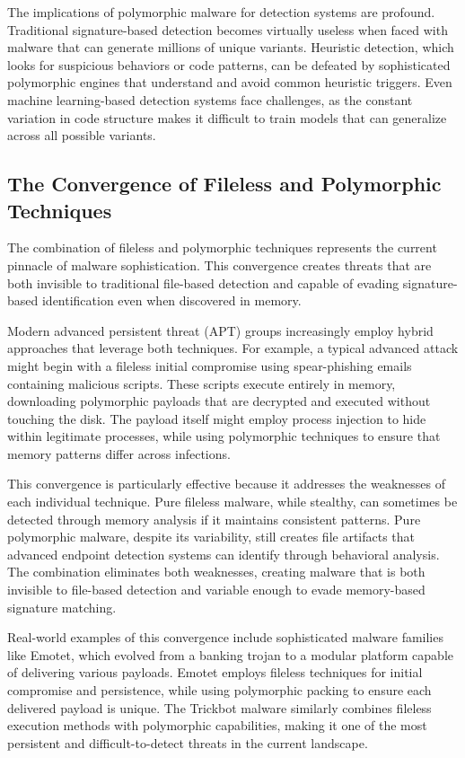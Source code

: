 The implications of polymorphic malware for detection systems are profound. Traditional signature-based detection becomes virtually useless when faced with malware that can generate millions of unique variants. Heuristic detection, which looks for suspicious behaviors or code patterns, can be defeated by sophisticated polymorphic engines that understand and avoid common heuristic triggers. Even machine learning-based detection systems face challenges, as the constant variation in code structure makes it difficult to train models that can generalize across all possible variants.

\subsection{The Convergence of Fileless and Polymorphic Techniques}
\label{subsec:convergence}

The combination of fileless and polymorphic techniques represents the current pinnacle of malware sophistication. This convergence creates threats that are both invisible to traditional file-based detection and capable of evading signature-based identification even when discovered in memory.

Modern advanced persistent threat (APT) groups increasingly employ hybrid approaches that leverage both techniques. For example, a typical advanced attack might begin with a fileless initial compromise using spear-phishing emails containing malicious scripts. These scripts execute entirely in memory, downloading polymorphic payloads that are decrypted and executed without touching the disk. The payload itself might employ process injection to hide within legitimate processes, while using polymorphic techniques to ensure that memory patterns differ across infections.

This convergence is particularly effective because it addresses the weaknesses of each individual technique. Pure fileless malware, while stealthy, can sometimes be detected through memory analysis if it maintains consistent patterns. Pure polymorphic malware, despite its variability, still creates file artifacts that advanced endpoint detection systems can identify through behavioral analysis. The combination eliminates both weaknesses, creating malware that is both invisible to file-based detection and variable enough to evade memory-based signature matching.

Real-world examples of this convergence include sophisticated malware families like Emotet, which evolved from a banking trojan to a modular platform capable of delivering various payloads. Emotet employs fileless techniques for initial compromise and persistence, while using polymorphic packing to ensure each delivered payload is unique. The Trickbot malware similarly combines fileless execution methods with polymorphic capabilities, making it one of the most persistent and difficult-to-detect threats in the current landscape.

